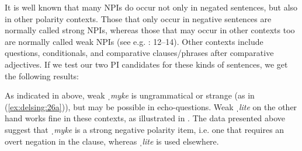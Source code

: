 \documentclass[output=paper]{langscibook}
\begin{document}
It is well known that many NPIs do occur not only in negated sentences, but also in other polarity contexts. Those that only occur in negative sentences are normally called strong NPIs, whereas those that may occur in other contexts too are normally called weak NPIs (see e.g. \citealt{Brandtler2010}: 12–14). Other contexts include questions, conditionals, and comparative clauses/phrases after comparative adjectives. If we test our two PI candidates for these kinds of sentences, we get the following results:


\ea\label{ex:delsing:26}\judgewidth{\#}
\z
\ex\label{ex:delsing:27}
\z
\z


As indicated in  above, weak \textit{ˌmyke} is ungrammatical or strange (as in (\ref{ex:delsing:26a})), but may be possible in echo-questions. Weak \textit{ˌlite} on the other hand works fine in these contexts, as illustrated in . The data presented above suggest that \textit{ˌmyke} is a strong negative polarity item, i.e. one that requires an overt negation in the clause, whereas \textit{ˌlite} is used elsewhere.
\end{document}

